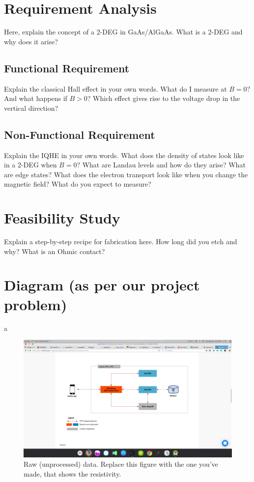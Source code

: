 \documentclass[a4paper]{report}
\begin{document}
    \section{Requirement Analysis}
    Here, explain the concept of a 2-DEG in GaAs/AlGaAs. What is a 2-DEG and why does it arise?
    \subsection{Functional Requirement}
    Explain the classical Hall effect in your own words. What do I measure at $B=0$? And what happens if $B>0$? Which effect gives rise to the voltage drop in the vertical direction?
    \subsection{Non-Functional Requirement}
    Explain the IQHE in your own words. What does the density of states look like in a 2-DEG when $B=0$? What are Landau levels and how do they arise? What are edge states? What does the electron transport look like when you change the magnetic field? What do you expect to measure?    
    \section{Feasibility Study}    
    Explain a step-by-step recipe for fabrication here. How long did you etch and why? What is an Ohmic contact?
    \section{Diagram (as per our project problem)}
    a
    \begin{figure}
    \centering
    \includegraphics[width=1\textwidth]{test.png}
    \caption{\label{fig:data}Raw (unprocessed) data. Replace this figure with the one you've made, that shows the resistivity.}
    \end{figure}    
    
\end{document}
